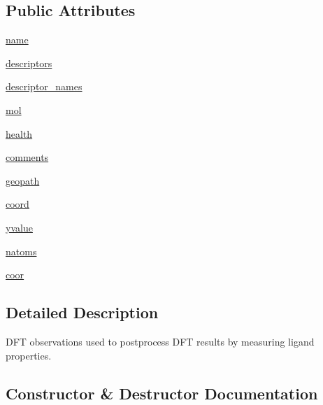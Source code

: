 \subsection*{Public Attributes}
\begin{DoxyCompactItemize}
\item 
\hyperlink{classmolSimplify_1_1Classes_1_1dft__obs_1_1dft__observation_ac6d6bb5f8bab62c015d503390b3266b1}{name}
\item 
\hyperlink{classmolSimplify_1_1Classes_1_1dft__obs_1_1dft__observation_a37ba367d00dd9402230cc35ca26da4fe}{descriptors}
\item 
\hyperlink{classmolSimplify_1_1Classes_1_1dft__obs_1_1dft__observation_aed3ee129ea960b5c9dd47c67cf2ee9ea}{descriptor\+\_\+names}
\item 
\hyperlink{classmolSimplify_1_1Classes_1_1dft__obs_1_1dft__observation_afa4d8b0b227091587adcca0369298526}{mol}
\item 
\hyperlink{classmolSimplify_1_1Classes_1_1dft__obs_1_1dft__observation_a42712d3426a8a353a85b9eb9705dc177}{health}
\item 
\hyperlink{classmolSimplify_1_1Classes_1_1dft__obs_1_1dft__observation_a066e80e95ba60d9c47f429a2cfb80cc6}{comments}
\item 
\hyperlink{classmolSimplify_1_1Classes_1_1dft__obs_1_1dft__observation_ab37a4e8468ae3226fe959ff5e9dedfd9}{geopath}
\item 
\hyperlink{classmolSimplify_1_1Classes_1_1dft__obs_1_1dft__observation_a27a15326c6736a859dff035435df69e9}{coord}
\item 
\hyperlink{classmolSimplify_1_1Classes_1_1dft__obs_1_1dft__observation_a2c8009a24b9afeda8f476b9cd62aebd4}{yvalue}
\item 
\hyperlink{classmolSimplify_1_1Classes_1_1dft__obs_1_1dft__observation_ae0c57091ff5a50d77e54cfc44977de18}{natoms}
\item 
\hyperlink{classmolSimplify_1_1Classes_1_1dft__obs_1_1dft__observation_aad1241c6ecc3a8523e003a0932c7557f}{coor}
\end{DoxyCompactItemize}


\subsection{Detailed Description}
D\+FT observations used to postprocess D\+FT results by measuring ligand properties. 

\subsection{Constructor \& Destructor Documentation}
\mbox{\label{classmolSimplify_1_1Classes_1_1dft__obs_1_1dft__observation_a44238b2c5816f42b2971cd8627142c39}} 
